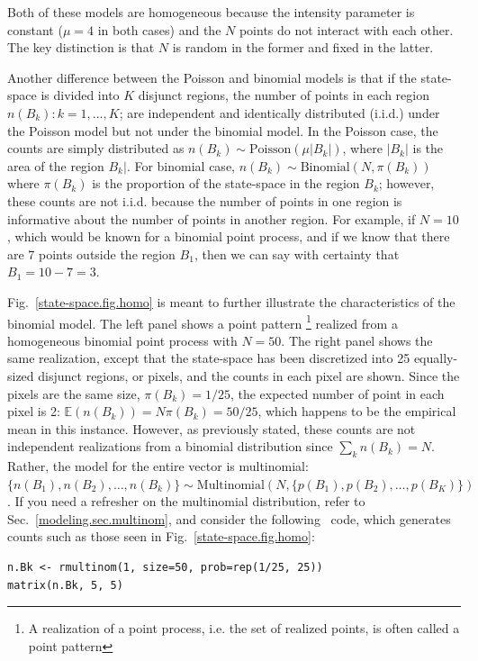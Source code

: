 {\flushleft Both of these models are homogeneous because the intensity parameter
is constant ($\mu=4$ in both cases) and the $N$ points do not interact
with each other. The key distinction is that $N$ is random
in the former and fixed in the latter.}

Another difference between the Poisson and binomial models is that if the
state-space is divided into $K$ disjunct regions, the number of points in each
region $n(B_k): k=1,\dots,K$; are independent and identically
distributed (i.i.d.) under the Poisson model but not under the
binomial model. In the Poisson case,
the counts are simply distributed as $n(B_k) \sim
\text{Poisson}(\mu|B_k|)$, where $|B_k|$ is the area of the region
$B_k|$. For binomial case, $n(B_k) \sim
\text{Binomial}(N, \pi(B_k))$ where $\pi(B_k)$ is the proportion of
the state-space in the region $B_k$; however, these counts are not
i.i.d. because the number of points in one region is informative
about the number of points in another region. For example, if
$N=10$, which would be known for a binomial point process, and if we
know that there are 7 points outside the region $B_1$,
then we can say with certainty that $B_1 = 10 - 7 = 3$.

Fig.~\ref{state-space.fig.homo} is meant to further illustrate the characteristics
of the binomial model. The left panel shows a point pattern
\footnote{A realization of a
point process, i.e. the set of realized points, is often called a
point pattern} realized from a
homogeneous binomial point process with $N=50$. The right panel shows
the same realization, except that the state-space has been discretized
into 25 equally-sized disjunct regions, or pixels, and the counts in each pixel
are shown. Since the pixels are the same
size, $\pi(B_k) = 1/25$, the expected number of point in each
pixel is 2: $\mathbb{E}(n(B_k)) = N\pi(B_k) = 50/25$, which
happens to be the empirical mean in this instance. However, as
previously stated, these counts are not
independent realizations from a binomial distribution since $\sum_k
n(B_k) = N$. Rather, the model for the entire vector is multinomial:
$\{n(B_1), n(B_2), \dots, n(B_k)\} \sim \mbox{Multinomial}(N, \{p(B_1), p(B_2), \dots,
p(B_K) \})$ \citep{illian_etal:2008}. If you need a refresher on the
multinomial distribution, refer to Sec.~\ref{modeling.sec.multinom}, and
consider the following \R~code, which generates counts such as those
seen in Fig.~\ref{state-space.fig.homo}:
\begin{verbatim}
n.Bk <- rmultinom(1, size=50, prob=rep(1/25, 25))
matrix(n.Bk, 5, 5)
\end{verbatim}

